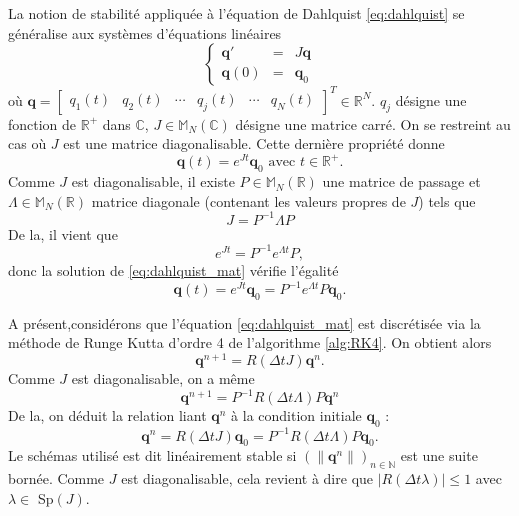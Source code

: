 La notion de stabilité appliquée à l'équation de Dahlquist \eqref{eq:dahlquist} se généralise aux systèmes d'équations linéaires
\begin{equation}
\left\lbrace
\begin{array}{rcl}
\mathbf{q}' & = & J \mathbf{q} \\
\mathbf{q}(0) & = & \mathbf{q}_0 
\end{array}
\right.
\label{eq:dahlquist_mat}
\end{equation}
où $\mathbf{q} = \begin{bmatrix}
q_1(t) & q_2(t) & \cdots & q_j(t) & \cdots & q_N(t)
\end{bmatrix}^T \in \mathbb{R}^N$.
$q_j$ désigne une fonction de $\mathbb{R}^+$ dans $\mathbb{C}$, $J \in \mathbb{M}_N (\mathbb{C})$ désigne une matrice carré. On se restreint au cas où $J$ est une matrice diagonalisable.
Cette dernière propriété donne
\begin{equation}
\mathbf{q}(t) = e^{Jt}\mathbf{q}_0 \text{ avec } t \in \mathbb{R}^+.
\end{equation}
Comme $J$ est diagonalisable, il existe $P \in \mathbb{M}_N(\mathbb{R})$ une matrice de passage et $\Lambda \in \mathbb{M}_N(\mathbb{R})$ matrice diagonale (contenant les valeurs propres de $J$) tels que
\begin{equation}
J = P^{-1} \Lambda P
\end{equation}
De la, il vient que 
\begin{equation}
e^{Jt} = P^{-1}e^{\Lambda t}P,
\end{equation}
donc la solution de \eqref{eq:dahlquist_mat} vérifie l'égalité 
\begin{equation}
\mathbf{q}(t) = e^{Jt}\mathbf{q}_0 = P^{-1}e^{\Lambda t}P\mathbf{q}_0.
\end{equation}

A présent,considérons que l'équation \eqref{eq:dahlquist_mat} est discrétisée via la méthode de Runge Kutta d'ordre 4 de l'algorithme \ref{alg:RK4}. On obtient alors 
\begin{equation}
\mathbf{q}^{n+1} = R(\Delta t J) \mathbf{q}^n.
\end{equation}
Comme $J$ est diagonalisable, on a même
\begin{equation}
\mathbf{q}^{n+1} = P^{-1}R(\Delta t \Lambda)P \mathbf{q}^n
\end{equation}
De la, on déduit la relation liant $\mathbf{q}^n$ à la condition initiale $\mathbf{q}_0$ : 
\begin{equation}
\mathbf{q}^n = R(\Delta t J) \mathbf{q}_0 = P^{-1}R(\Delta t \Lambda)P \mathbf{q}_0.
\end{equation}
Le schémas utilisé est dit linéairement stable si $\left( \| \mathbf{q}^n \| \right)_{n \in \mathbb{N}}$ est une suite bornée. Comme $J$ est diagonalisable, cela revient à dire que $| R(\Delta t \lambda) | \leq 1$ avec $\lambda \in $ Sp$(J)$.


